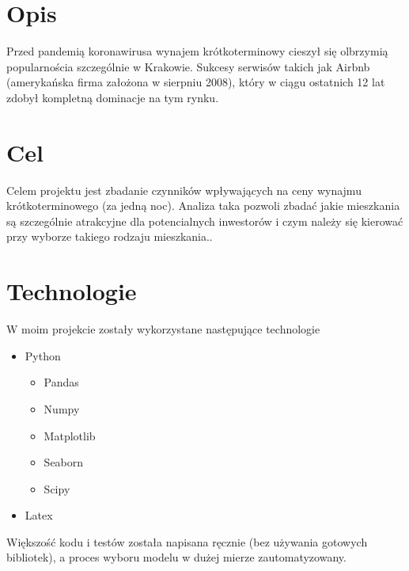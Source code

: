 \section{Opis}\label{sec:opis}

Przed pandemią koronawirusa wynajem krótkoterminowy cieszył się olbrzymią popularnościa szczególnie w Krakowie.
Sukcesy serwisów takich jak Airbnb (amerykańska firma założona w sierpniu 2008), który w ciągu ostatnich 12 lat zdobył kompletną dominacje na tym rynku.


\section{Cel}\label{sec:cel}
Celem projektu jest zbadanie czynników wpływających na ceny wynajmu krótkoterminowego (za jedną noc).
Analiza taka pozwoli zbadać jakie mieszkania są szczególnie atrakcyjne dla potencialnych inwestorów i czym należy się kierować przy wyborze takiego rodzaju mieszkania..

\section{Technologie}\label{sec:technologie}

W moim projekcie zostały wykorzystane następujące technologie
\begin{itemize}
    \item Python
    \begin{itemize}
        \item Pandas
        \item Numpy
        \item Matplotlib
        \item Seaborn
        \item Scipy
    \end{itemize}
    \item Latex
\end{itemize}

Większość kodu i testów została napisana ręcznie (bez używania gotowych bibliotek), a proces wyboru modelu w dużej mierze zautomatyzowany.